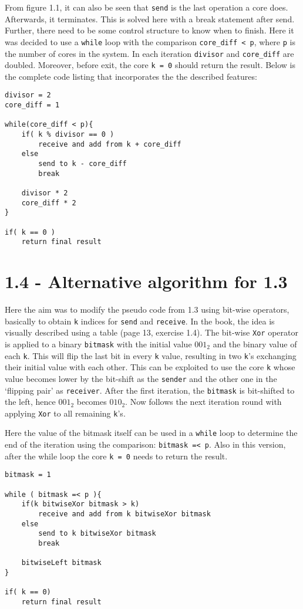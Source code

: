 \documentclass[a4paper,11pt,twoside]{article}
\begin{document}
From figure 1.1, it can also be seen that \verb+send+ is the last operation a core does. Afterwards, it terminates. This is solved here with a break statement after send. Further, there need to be some control structure to know when to finish. Here it was decided to use a \verb+while+ loop with the comparison \verb+core_diff < p+, where \verb+p+ is the number of cores in the system. In each iteration \verb+divisor+ and \verb+core_diff+ are doubled. Moreover, before exit, the core \verb+k = 0+ should return the result. Below is the complete code listing that incorporates the the described features:

\begin{verbatim}
divisor = 2
core_diff = 1

while(core_diff < p){
    if( k % divisor == 0 )
        receive and add from k + core_diff
    else 
        send to k - core_diff
        break

    divisor * 2
    core_diff * 2
}

if( k == 0 )
    return final result
\end{verbatim}

\section{1.4 - Alternative algorithm for 1.3}
Here the aim was to modify the pseudo code from 1.3 using bit-wise operators, basically to obtain \verb+k+ indices for \verb+send+ and \verb+receive+. In the book, the idea is visually described using a table (page 13, exercise 1.4). The bit-wise \verb+Xor+ operator is applied to a binary \verb+bitmask+ with the initial value $001_{2}$ and the binary value of each \verb+k+. This will flip the last bit in every \verb+k+ value, resulting in two \verb+k+'s exchanging their initial value with each other. This can be exploited to use the core \verb+k+ whose value becomes lower by the bit-shift as the \verb+sender+ and the other one in the `flipping pair' as \verb+receiver+. After the first iteration, the \verb+bitmask+ is bit-shifted to the left, hence $001_{2}$ becomes $010_{2}$. Now follows the next iteration round with applying \verb+Xor+ to all remaining \verb+k+'s.      

Here the value of the bitmask itself can be used in a \verb+while+ loop to determine the end of the iteration using the comparison: \verb+bitmask =< p+. Also in this version, after the while loop the core \verb+k = 0+ needs to return the result.

\begin{verbatim}
bitmask = 1

while ( bitmask =< p ){
    if(k bitwiseXor bitmask > k)
        receive and add from k bitwiseXor bitmask
    else
        send to k bitwiseXor bitmask
        break

    bitwiseLeft bitmask
}

if( k == 0)
    return final result

\end{verbatim}
\end{document}

